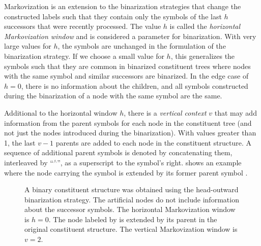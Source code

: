 \documentclass[../../document.tex]{subfiles}
\begin{document}
    Markovization is an extension to the binarization strategies that change the constructed labels such that they contain only the symbols of the last \(h\) successors that were recently processed.
    The value \(h\) is called the \emph{horizontal Markovization window} and is considered a parameter for binarization.
    With very large values for \(h\), the symbols are unchanged in the formulation of the binarization strategy.
    If we choose a small value for \(h\), this generalizes the symbols such that they are common in binarized constituent trees where nodes with the same symbol and similar successors are binarized.
    In the edge case of \(h=0\), there is no information about the children, and all symbols constructed during the binarization of a node with the same symbol are the same.

    Additional to the horizontal window \(h\), there is a \emph{vertical context} \(v\) that may add information from the parent symbols for each node in the constituent tree (and not just the nodes introduced during the binarization).
    With values greater than 1, the last \(v-1\) parents are added to each node in the constituent structure.
    A sequence of additional parent symbols is denoted by concatenating them, interleaved by ``$^\wedge$'', as a superscript to the symbol's right.
     shows an example where the node carrying the symbol  is extended by its former parent symbol .

    \begin{figure}
        \centering
        
        \caption{\label{fig:ex:markovization}
            A binary constituent structure was obtained using the head-outward binarization strategy.
            The artificial nodes do not include information about the successor symbols. The horizontal Markovization window is \(h = 0\).
            The node labeled by \label{np} is extended by its parent in the original constituent structure. The vertical Markovization window is \(v = 2\).}
    \end{figure}
\end{document}
